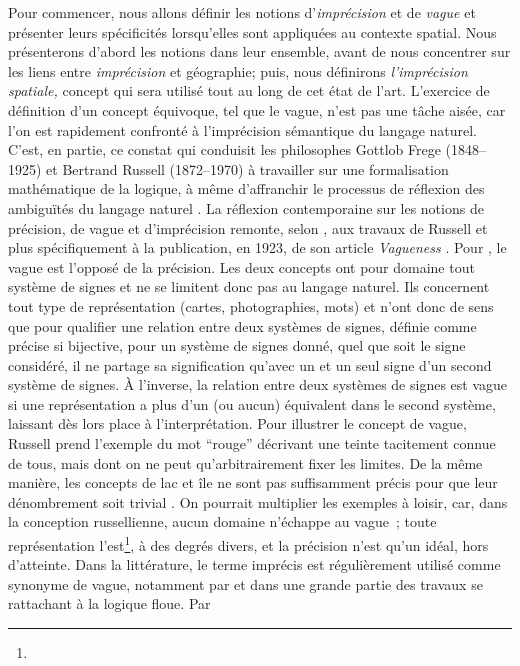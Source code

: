 Pour commencer, nous allons définir les notions d’\emph{imprécision}
et de \emph{vague} et présenter leurs spécificités lorsqu’elles sont
appliquées au contexte spatial. Nous présenterons d’abord les notions
dans leur ensemble, avant de nous concentrer sur les liens entre
\emph{imprécision} et géographie; puis, nous définirons\emph{
  l’imprécision spatiale,} concept qui sera utilisé tout au long de
cet état de l’art.  L’exercice de définition d’un concept équivoque,
tel que le vague, n’est pas une tâche aisée, car l’on est rapidement
confronté à l’imprécision sémantique du langage naturel. C’est, en
partie, ce constat qui conduisit les philosophes Gottlob Frege
(1848–1925) et Bertrand Russell (1872–1970) à travailler sur une
formalisation mathématique de la logique, à même d’affranchir le
processus de réflexion des ambiguïtés du langage naturel
\autocite{Williamson1994}. La réflexion contemporaine sur les notions
de précision, de vague et d’imprécision remonte, selon
\textcite{Williamson1994}, aux travaux de Russell et plus
spécifiquement à la publication, en 1923, de son article
\emph{Vagueness} \autocite{Russell1923}. Pour \textcite{Russell1923},
le vague est l’opposé de la précision. Les deux concepts ont pour
domaine tout système de signes et ne se limitent donc pas au langage
naturel. Ils concernent tout type de représentation (\eg cartes,
photographies, mots) et n’ont donc de sens que pour qualifier une
relation entre deux systèmes de signes, définie comme précise si
bijective, \ie pour un système de signes donné, quel que soit le signe
considéré, il ne partage sa signification qu’avec un et un seul signe
d’un second système de signes. À l’inverse, la relation entre deux
systèmes de signes est vague si une représentation a plus d’un (ou
aucun) équivalent dans le second système, laissant dès lors place à
l’interprétation. Pour illustrer le concept de vague, Russell prend
l’exemple du mot “rouge” décrivant une teinte tacitement connue de
tous, mais dont on ne peut qu’arbitrairement fixer les limites. De la
même manière, les concepts de lac et île ne sont pas suffisamment
précis pour que leur dénombrement soit trivial
\autocite{Sarjakoski1996}. On pourrait multiplier les exemples à
loisir, car, dans la conception russellienne, aucun domaine n’échappe
au vague ; toute représentation l’est\footnote{}, à des degrés divers,
et la précision n’est qu’un idéal, hors d’atteinte.  Dans la
littérature, le terme imprécis est régulièrement utilisé comme
synonyme de vague, notamment par \textcite{Zadeh1965} et dans une
grande partie des travaux se rattachant à la logique floue. Par
